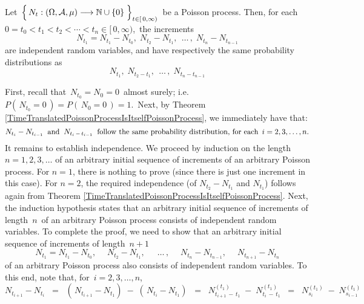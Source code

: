 \vskip 0.5cm
\begin{theorem}
\mbox{}
\vskip 0.15cm
\noindent
Let
\,$\left\{\,N_{t} : (\Omega,\mathcal{A},\mu) \overset{{\color{white}-}}{\longrightarrow} \N\cup\{0\} \;\right\}_{t \in [\,0,\infty)}$\,
be a Poisson process.
Then, for each \,$0 = t_{0} < t_{1} < t_{2} < \cdots < t_{n} \in [\,0,\infty)$,\,
the increments
\begin{equation*}
N_{t_{1}} = N_{t_{1}} - N_{t_{0}},\;
N_{t_{2}} - N_{t_{1}},\;
\,\ldots\,,\;
N_{t_{n}} - N_{t_{n-1}}
\end{equation*}
are independent random variables, and have respectively the same probability distributions as
\begin{equation*}
N_{t_{1}},\;
N_{t_{2} - t_{1}},\;
\,\ldots\,,\;
N_{t_{n} - t_{n-1}}
\end{equation*}
\end{theorem}
\proof
First, recall that \,$N_{t_{0}} = N_{0} = 0$\, almost surely;
i.e. \,$P(\,N_{t_{0}} = 0\,) = P(\,N_{0} = 0\,) = 1$.\,
Next, by Theorem \ref{TimeTranslatedPoissonProcessIsItselfPoissonProcess},
we immediately have that:
\begin{equation*}
N_{t_{i}} - N_{t_{i-1}}
\;\;\textnormal{and}\;\;
N_{t_{i} \,-\, t_{i-1}}
\;\;\textnormal{follow the same probability distribution, for each \,$i = 2, 3, \ldots, n$}.
\end{equation*}
It remains to establish independence.
We proceed by induction on the length $n = 1, 2, 3, \ldots $ of an arbitrary initial sequence of
increments of an arbitrary Poisson process.
For $n =1$, there is nothing to prove (since there is just one increment in this case).
For $n = 2$, the required independence (of $N_{t_{2}} - N_{t_{1}}$ and $N_{t_{1}}$)
follows again from Theorem \ref{TimeTranslatedPoissonProcessIsItselfPoissonProcess}.
Next, the induction hypothesis states that
an arbitrary initial sequence of increments of length \,$n$\, of an arbitrary Poisson process
consists of independent random variables.
To complete the proof, we need to show that 
an arbitrary initial sequence of increments of length \,$n+1$
\begin{equation}\label{initialIncrementSequenceLengthNplusOne}
N_{t_{1}} = N_{t_{1}} - N_{t_{0}},\;
\quad
N_{t_{2}} - N_{t_{1}},\;
\quad
\,\ldots\,,\;
\quad
N_{t_{n}} - N_{t_{n-1}},\;
\quad
N_{t_{n+1}} - N_{t_{n}}
\end{equation}
of an arbitrary Poisson process also consists of independent random variables.
To this end, note that, for \,$i = 2, 3, \ldots, n$,
\begin{equation*}
N_{t_{i+1}} - N_{t_{i}}
\;\; = \;\;
	\left(\,N_{t_{i+1}}-N_{t_{1}}\right) \;-\; \left(\,N_{t_{i}} - N_{t_{1}}\right)
\;\; = \;\;
	N^{(t_{1})}_{t_{i+1}\,-\,t_{1}}
	\;-\;
	N^{(t_{1})}_{t_{i}\,-\,t_{1}}
\;\; = \;\;
	N^{(t_{1})}_{s_{i}}
	\;-\;
	N^{(t_{1})}_{s_{i-1}}
\end{equation*}
